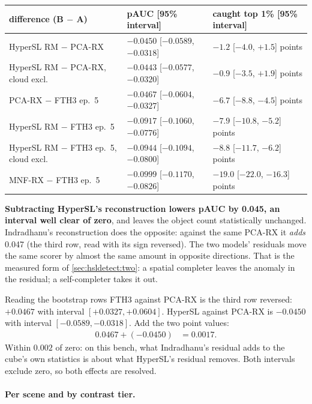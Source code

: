 \begin{center}\small
\begin{tabular}{@{}lll@{}}
\toprule
difference (B $-$ A) & pAUC [95\% interval] & caught top 1\% [95\% interval] \\
\midrule
HyperSL RM $-$ PCA-RX & $-0.0450$ [$-0.0589$, $-0.0318$] & $-1.2$ [$-4.0$, $+1.5$] points \\
HyperSL RM $-$ PCA-RX, cloud excl. & $-0.0443$ [$-0.0577$, $-0.0320$] & $-0.9$ [$-3.5$, $+1.9$] points \\
PCA-RX $-$ FTH3 ep.\ 5 & $-0.0467$ [$-0.0604$, $-0.0327$] & $-6.7$ [$-8.8$, $-4.5$] points \\
HyperSL RM $-$ FTH3 ep.\ 5 & $-0.0917$ [$-0.1060$, $-0.0776$] & $-7.9$ [$-10.8$, $-5.2$] points \\
HyperSL RM $-$ FTH3 ep.\ 5, cloud excl. & $-0.0944$ [$-0.1094$, $-0.0800$] & $-8.8$ [$-11.7$, $-6.2$] points \\
MNF-RX $-$ FTH3 ep.\ 5 & $-0.0999$ [$-0.1170$, $-0.0826$] & $-19.0$ [$-22.0$, $-16.3$] points \\
\bottomrule
\end{tabular}
\end{center}
\textbf{Subtracting HyperSL's reconstruction lowers pAUC by 0.045, an interval well clear of zero}, and leaves the object
count statistically unchanged. Indradhanu's reconstruction does the opposite: against the same PCA-RX it \emph{adds} 0.047
(the third row, read with its sign reversed). The two models' residuals move the same scorer by almost the same amount in
opposite directions\tagC. That is the measured form of \cref{sec:hsldetect:two}: a spatial completer leaves the anomaly in
the residual; a self-completer takes it out.

\begin{worked}[label={we:hsldetect:sym}]{Reading the bootstrap rows}
FTH3 against PCA-RX is the third row reversed: $+0.0467$ with interval $[+0.0327,+0.0604]$. HyperSL against PCA-RX is
$-0.0450$ with interval $[-0.0589,-0.0318]$. Add the two point values:
\begin{align*}
0.0467+(-0.0450) &= 0.0017 .
\end{align*}
Within $0.002$ of zero: on this bench, what Indradhanu's residual adds to the cube's own statistics is about what HyperSL's
residual removes\tagC. Both intervals exclude zero, so both effects are resolved.
\end{worked}

\paragraph{Per scene and by contrast tier.}

